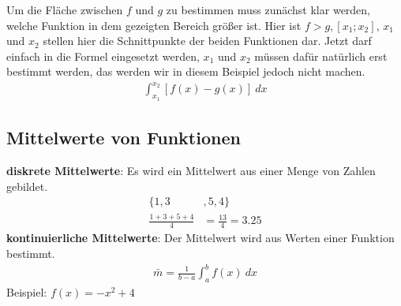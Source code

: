 \begin{center}
\end{center}

\begin{flushleft}
    Um die Fläche zwischen $f$ und $g$ zu bestimmen muss zunächst klar werden, welche Funktion in dem gezeigten Bereich größer ist.
    Hier ist $f > g, [x_1;x_2]$, $x_1$ und $x_2$ stellen hier die Schnittpunkte der beiden Funktionen dar.
    Jetzt darf einfach in die Formel eingesetzt werden, $x_1$ und $x_2$ müssen dafür natürlich erst bestimmt werden, das werden wir in diesem Beispiel jedoch nicht machen.
    \begin{align}
        \int_{x_1}^{x_2} \left[f(x)-g(x)\right] \ dx
    \end{align}
\end{flushleft}

\subsection{Mittelwerte von Funktionen}
\begin{flushleft}
    \textbf{diskrete Mittelwerte}: \newline
    Es wird ein Mittelwert aus einer Menge von Zahlen gebildet. \newline
    \begin{align}
        \{1,3&,5,4\} \\
        \frac{1+3+5+4}{4}&=\frac{13}{4}=3.25
    \end{align}
    \newline
    \textbf{kontinuierliche Mittelwerte}: \newline
    Der Mittelwert wird aus Werten einer Funktion bestimmt. \newline
    \begin{align}
        \bar{m}=\frac{1}{b-a}\int_{a}^{b} f(x) \ dx
    \end{align}
    Beispiel: $f(x)=-x^2+4$
\end{flushleft}


